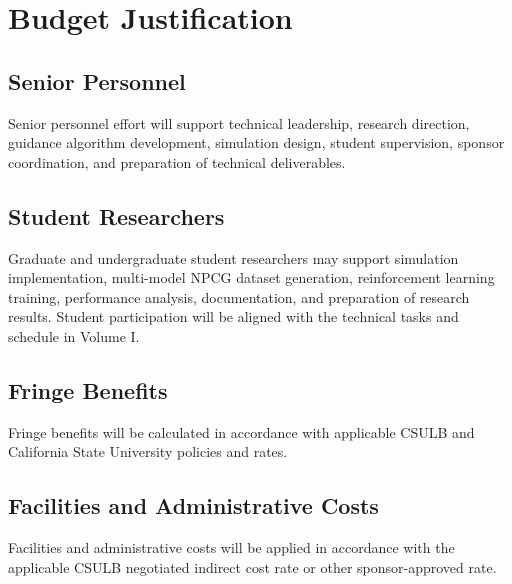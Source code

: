 \section{Budget Justification}

\subsection{Senior Personnel}

Senior personnel effort will support technical leadership, research direction, guidance algorithm development, simulation design, student supervision, sponsor coordination, and preparation of technical deliverables.

\subsection{Student Researchers}

Graduate and undergraduate student researchers may support simulation implementation, multi-model NPCG dataset generation, reinforcement learning training, performance analysis, documentation, and preparation of research results. Student participation will be aligned with the technical tasks and schedule in Volume I.

\subsection{Fringe Benefits}

Fringe benefits will be calculated in accordance with applicable CSULB and California State University policies and rates.

\subsection{Facilities and Administrative Costs}

Facilities and administrative costs will be applied in accordance with the applicable CSULB negotiated indirect cost rate or other sponsor-approved rate.
